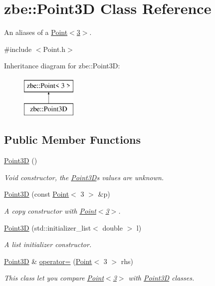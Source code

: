 \hypertarget{classzbe_1_1_point3_d}{}\section{zbe\+:\+:Point3\+D Class Reference}
\label{classzbe_1_1_point3_d}


An aliases of a \hyperlink{classzbe_1_1_point}{Point$<$3$>$}.  




{\ttfamily \#include $<$Point.\+h$>$}

Inheritance diagram for zbe\+:\+:Point3\+D\+:\begin{figure}[H]
\begin{center}
\leavevmode
\includegraphics[height=2.000000cm]{classzbe_1_1_point3_d}
\end{center}
\end{figure}
\subsection*{Public Member Functions}
\begin{DoxyCompactItemize}
\item 
\hyperlink{classzbe_1_1_point3_d_ab2ceb379ccb84e342f5dbeeacb6644e5}{Point3\+D} ()
\begin{DoxyCompactList}\small\item\em Void constructor, the \hyperlink{classzbe_1_1_point3_d}{Point3\+D}\textquotesingle{}s values are unknown. \end{DoxyCompactList}\item 
\hyperlink{classzbe_1_1_point3_d_a8d343c388d95bb8baddb912b34d4be62}{Point3\+D} (const \hyperlink{classzbe_1_1_point}{Point}$<$ 3 $>$ \&p)
\begin{DoxyCompactList}\small\item\em A copy constructor with \hyperlink{classzbe_1_1_point}{Point$<$3$>$}. \end{DoxyCompactList}\item 
\hyperlink{classzbe_1_1_point3_d_a389cf92ca16e6bf71df890b29f986609}{Point3\+D} (std\+::initializer\+\_\+list$<$ double $>$ l)
\begin{DoxyCompactList}\small\item\em A list initializer constructor. \end{DoxyCompactList}\item 
\hyperlink{classzbe_1_1_point3_d}{Point3\+D} \& \hyperlink{classzbe_1_1_point3_d_a3deee1b44844d60c3fdabfca0af47379}{operator=} (\hyperlink{classzbe_1_1_point}{Point}$<$ 3 $>$ rhs)
\begin{DoxyCompactList}\small\item\em This class let you compare \hyperlink{classzbe_1_1_point}{Point$<$3$>$} with \hyperlink{classzbe_1_1_point3_d}{Point3\+D} classes. \end{DoxyCompactList}\end{DoxyCompactItemize}
